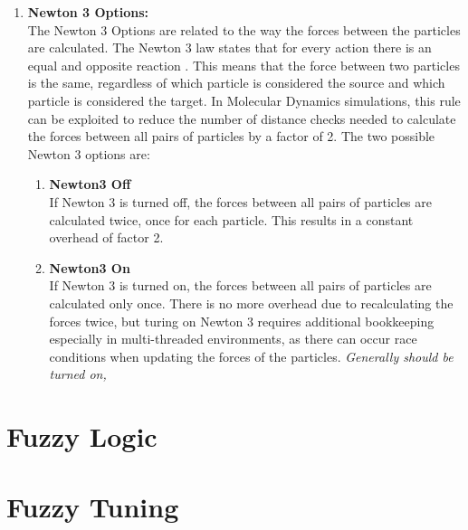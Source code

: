 \begin{enumerate}[label=\textbf{\arabic*.}]
      \item \textbf{Newton 3 Options:} \\
            The Newton 3 Options are related to the way the forces between the particles are calculated. The Newton 3 law states that for every action there is an equal and opposite reaction . This means that the force between two particles is the same, regardless of which particle is considered the source and which particle is considered the target. In Molecular Dynamics simulations, this rule can be exploited to reduce the number of distance checks needed to calculate the forces between all pairs of particles by a factor of 2. The two possible Newton 3 options are:
            \begin{enumerate}
                  \item \textbf{Newton3 Off} \\
                        If Newton 3 is turned off, the forces between all pairs of particles are calculated twice, once for each particle. This results in a constant overhead of factor 2.

                  \item \textbf{Newton3 On} \\
                        If Newton 3 is turned on, the forces between all pairs of particles are calculated only once. There is no more overhead due to recalculating the forces twice, but turing on Newton 3 requires additional bookkeeping especially in multi-threaded environments, as there can occur race conditions when updating the forces of the particles. 
                        \textit{Generally should be turned on, }
            \end{enumerate}

\end{enumerate}

\section{Fuzzy Logic}

\section{Fuzzy Tuning}


